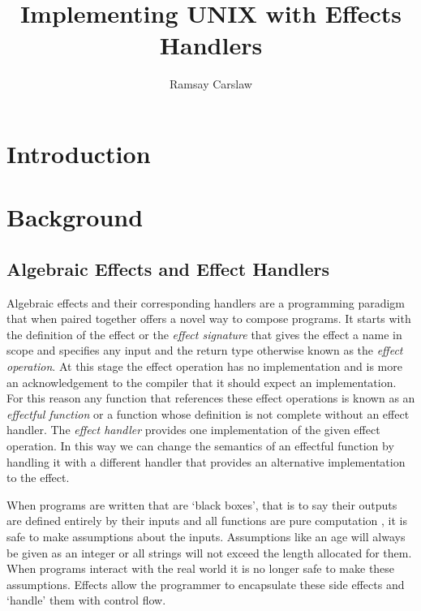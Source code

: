 \documentclass{report}
\title{Implementing UNIX with Effects Handlers}
\author{Ramsay Carslaw}
\begin{document}
\maketitle

\tableofcontents

\chapter{Introduction}

\chapter{Background}

\section{Algebraic Effects and Effect Handlers}

Algebraic effects \cite{plotkin2002computational} and their corresponding
handlers \cite{plotkin2009handlers} \cite{pretnar2015introduction} are a
programming paradigm that when paired together offers a novel way to compose
programs. It starts with the definition of the effect or the \emph{effect
signature} that gives the effect a name in scope and specifies any input and
the return type otherwise known as the \emph{effect operation}. At this stage
the effect operation has no implementation and is more an acknowledgement to
the compiler that it should expect an implementation. For this reason any
function that references these effect operations is known as an \emph{effectful
function} or a function whose definition is not complete without an effect
handler. The \emph{effect handler} provides one implementation of the given
effect operation. In this way we can change the semantics of an effectful
function by handling it with a different handler that provides an alternative
implementation to the effect. 

When programs are written that are `black boxes', that is to say their outputs
are defined entirely by their inputs and all functions are pure computation
\cite{hughes1989functional}, it is safe to make assumptions about the inputs.
Assumptions like an age will always be given as an integer or all strings will
not exceed the length allocated for them. When programs interact with the real
world it is no longer safe to make these assumptions. Effects allow the
programmer to encapsulate these side effects and `handle' them with control
flow. 
\end{document}
